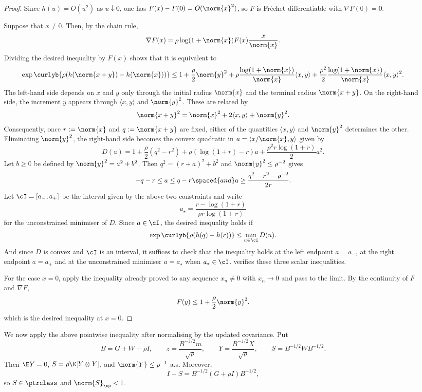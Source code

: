 \documentclass[11pt]{article}
\let\cref\zcref
\begin{document}
\begin{proof}
  Since $h(u) = O(u^2)$ as $u \downarrow 0$, one has $F(x) - F(0) = O(\norm{x}^2)$, so $F$ is Fréchet differentiable with $\nabla F(0) = 0$.

  Suppose that $x\ne0$. Then, by the chain rule,
  \[
    \nabla F(x) = \rho\log(1+\norm{x})F(x)\frac{x}{\norm{x}}.
  \]
  Dividing the desired inequality by $F(x)$ shows that it is equivalent to
\[
  \exp\curlyb{\rho (h(\norm{x+y}) - h(\norm{x}))} \leq 1 + \frac{\rho}{2}\norm{y}^2 + \rho \frac{\log(1+\norm{x})}{\norm{x}} \langle x,y \rangle + \frac{\rho^2}{2} \frac{\log(1+\norm{x})}{\norm{x}} \langle x, y \rangle^2.
\]
The left-hand side depends on $x$ and $y$ only through the initial radius $\norm{x}$ and the terminal radius $\norm{x+y}$. On the right-hand side, the increment $y$ appears through $\langle x,y \rangle$ and $\norm{y}^2$. These are related by
\[
  \norm{x+y}^2 = \norm{x}^2 + 2\langle x,y \rangle + \norm{y}^2.
\]
Consequently, once $r:=\norm{x}$ and $q:=\norm{x+y}$ are fixed, either of the quantities $\langle x,y \rangle$ and $\norm{y}^2$ determines the other. Eliminating $\norm{y}^2$, the right-hand side becomes the convex quadratic in $a= \langle x/\norm{x}, y\rangle$ given by
\[
  D(a) = 1+\frac{\rho}{2}(q^2 - r^2) + \rho (\log(1+r) - r) a + \frac{\rho^2 r\log(1+r)}{2} a^2.
\]
Let $b \geq 0$ be defined by $\norm{y}^2 = a^2 + b^2$. Then $q^2 = (r+a)^2 + b^2$ and $\norm{y}^2 \leq \rho^{-2}$ gives
\[
  -q-r \leq a \leq q-r \spaced{and} a \geq \frac{q^2-r^2-\rho^{-2}}{2r}.
\]
Let $\cI=[a_-,a_+]$ be the interval given by the above two constraints and write
\[
   a_\star = \frac{r-\log(1+r)}{\rho r\log(1+r)}
\]
for the unconstrained minimiser of $D$. Since $a\in\cI$, the desired inequality holds if
\[
  \exp\curlyb{\rho (h(q) - h(r))} \leq \min_{u\in\cI} D(u).
\]
And since $D$ is convex and $\cI$ is an interval, it suffices to check that the inequality holds at the left endpoint $a=a_-$, at the right endpoint $a = a_+$ and at the unconstrained minimiser $a = a_\star$ when $a_\star\in\cI$. \cref{app:scalar-bellman} verifies these three scalar inequalities.

For the case $x = 0$, apply the inequality already proved to any sequence $x_n \neq 0$ with $x_n \to 0$ and pass to the limit. By the continuity of $F$ and $\nabla F$,
\[
  F(y) \leq 1 + \frac{\rho}{2} \norm{y}^2,
\]
which is the desired inequality at $x=0$.
\end{proof}


We now apply the above pointwise inequality after normalising by the updated covariance. Put
\[
  B=G+W+\rho I,\qquad z=\frac{B^{-1/2}m}{\sqrt\rho},\qquad Y=\frac{B^{-1/2}X}{\sqrt\rho},\qquad
  S=B^{-1/2}WB^{-1/2}.
\]
Then $\E Y=0$, $S=\rho\E[Y\otimes Y]$, and $\norm{Y}\le\rho^{-1}$ a.s. Moreover,
\[
  I-S=B^{-1/2}(G+\rho I)B^{-1/2},
\]
so $S\in\ptrclass$ and $\norm{S}_{\op}<1$.
\end{document}
